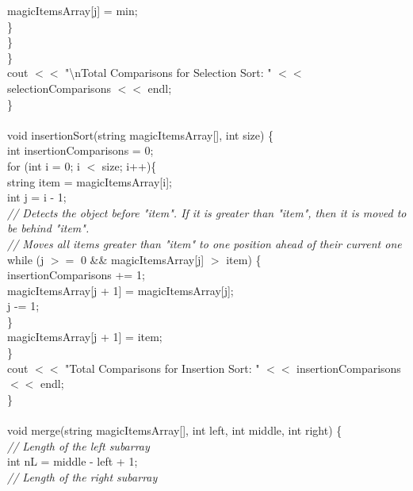 \documentclass{article}
\begin{document}
\begin {linenumbers}
                \indent \indent \indent \indent magicItemsArray[j] = min;\\
            \indent \indent \indent \}\\
        \indent \indent \}\\
    \indent \}\\
    \indent cout $<<$ "\textbackslash nTotal Comparisons for Selection Sort: " $<<$ selectionComparisons $<<$ endl;\\
\}\\
\\
void insertionSort(string magicItemsArray[], int size) \{\\
    \indent int insertionComparisons = 0;\\
    \indent for (int i = 0; i $<$ size; i++)\{\\
        \indent \indent string item = magicItemsArray[i];\\
        \indent \indent int j = i - 1;\\
        \textit{\indent \indent // Detects the object before "item". If it is greater than "item", then it is moved to be behind "item".\\
        \indent \indent // Moves all items greater than "item" to one position ahead of their current one\\}
        \indent \indent while (j $>=$ 0 \&\& magicItemsArray[j] $>$ item) \{\\
            \indent \indent \indent insertionComparisons += 1;\\
            \indent \indent \indent magicItemsArray[j + 1] = magicItemsArray[j];\\
            \indent \indent \indent j -= 1;\\
        \indent \indent \}\\
        \indent \indent magicItemsArray[j + 1] = item;\\
    \indent \}\\
    \indent cout $<<$ "Total Comparisons for Insertion Sort: " $<<$ insertionComparisons $<<$ endl;\\
\}\\
\\
void merge(string magicItemsArray[], int left, int middle, int right) \{\\
    \textit{\indent // Length of the left subarray\\}
    \indent int nL = middle - left + 1;\\
    \textit{\indent // Length of the right subarray\\}

\end{linenumbers}
\end{document}
